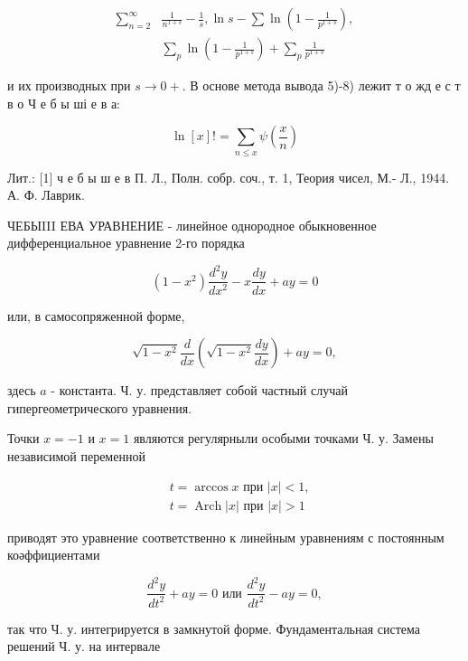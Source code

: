 \documentclass[10pt]{article}
\begin{document}
\[

\begin{aligned}

\sum_{n=2}^{\infty} & \frac{1}{n^{1+s}}-\frac{1}{s}, \ln s-\sum \ln \left(1-\frac{1}{p^{1+s}}\right), \\

& \sum_{p} \ln \left(1-\frac{1}{p^{1+s}}\right)+\sum_{p} \frac{1}{p^{1+s}}

\end{aligned}

\]



и их производных при $s \rightarrow 0+$. В основе метода вывода 5)-8) лежит т о жд е с т в о Ч е б ы ші е в а:



\[

\ln [x] !=\sum_{n \leqslant x} \psi\left(\frac{x}{n}\right)

\]



Лит.: [1] ч е б ы ш е в П. Л., Полн. собр. соч., т. 1, Теория чисел, М.- Л., 1944. А. Ф. Лаврик.



ЧЕБЫIII ЕВА УРАВНЕНИЕ - линейное однородное обыкновенное дифференциальное уравнение 2-го порядка



\[

\left(1-x^{2}\right) \frac{d^{2} y}{d x^{2}}-x \frac{d y}{d x}+a y=0

\]



или, в самосопряженной форме,



\[

\sqrt{1-x^{2}} \frac{d}{d x}\left(\sqrt{1-x^{2}} \frac{d y}{d x}\right)+a y=0,

\]



здесь $a$ - константа. Ч. у. представляет собой частный случай гипергеометрического уравнения.



Точки $x=-1$ и $x=1$ являются регулярныли особыми точками Ч. у. Замены независимой переменной



\[

\begin{aligned}

& t=\arccos x \text { при }|x|<1, \\

& t=\operatorname{Arch}|x| \text { при }|x|>1

\end{aligned}

\]



приводят это уравнение соответственно к линейным уравнениям с постоянным коәффициентами



\[

\frac{d^{2} y}{d t^{2}}+a y=0 \text { или } \frac{d^{2} y}{d t^{2}}-a y=0,

\]



так что Ч. у. интегрируется в замкнутой форме. Фундаментальная система решений Ч. у. на интервале
\end{document}
